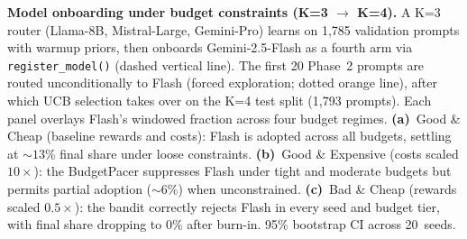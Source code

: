 
\textbf{Model onboarding under budget constraints (K=3 $\to$ K=4).}
A K=3 router (Llama-8B, Mistral-Large, Gemini-Pro) learns on 1{,}785
validation prompts with warmup priors, then onboards Gemini-2.5-Flash
as a fourth arm via \texttt{register\_model()} (dashed vertical line).
The first 20 Phase~2 prompts are routed unconditionally to Flash
(forced exploration; dotted orange line), after which UCB selection
takes over on the K=4 test split (1{,}793 prompts).
Each panel overlays Flash's windowed fraction across four budget
regimes.
\textbf{(a)}~Good \& Cheap (baseline rewards and costs): Flash is
adopted across all budgets, settling at ${\sim}13$\% final share under loose
constraints.
\textbf{(b)}~Good \& Expensive (costs scaled $10\times$): the
BudgetPacer suppresses Flash under tight and moderate budgets but
permits partial adoption (${\sim}6$\%) when unconstrained.
\textbf{(c)}~Bad \& Cheap (rewards scaled $0.5\times$): the bandit
correctly rejects Flash in every seed and budget tier, with final
share dropping to 0\% after burn-in.
95\% bootstrap CI across 20~seeds.
